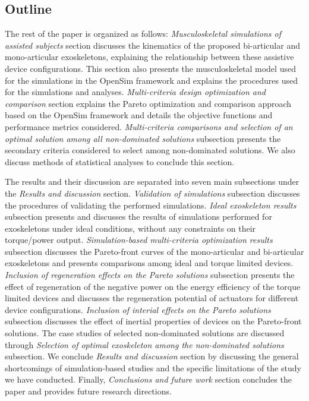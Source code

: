 \documentclass[10pt,letterpaper]{article}
\begin{document}
%


\subsection*{Outline}
The rest of the paper is organized as follows:  \emph{Musculoskeletal simulations of assisted subjects} section discusses the kinematics of the proposed bi-articular and mono-articular exoskeletons, explaining the relationship between these assistive device configurations. This section also presents the musculoskeletal model used for the simulations in the OpenSim framework and explains the procedures used for the simulations and analyses.  \emph{Multi-criteria design optimization and comparison} section explains the Pareto optimization and comparison approach based on the OpenSim framework and details the objective functions and performance metrics considered. \emph{Multi-criteria comparisons and selection of an optimal solution among all non-dominated solutions} subsection presents the  secondary criteria considered to select among non-dominated solutions. We also discuss methods of statistical analyses to conclude this section.

The results and their discussion are separated into seven main subsections under the \emph{Results and discussion} section. \emph{Validation of simulations} subsection discusses the procedures of validating the performed simulations. \emph{Ideal exoskeleton results} subsection presents and discusses the results of simulations performed for exoskeletons under ideal conditions, without any constraints on their torque/power output. \emph{Simulation-based multi-criteria optimization results} subsection discusses the Pareto-front curves of the mono-articular and bi-articular exoskeletons and presents comparisons among ideal and torque limited devices. \emph{Inclusion of regeneration effects on the Pareto solutions} subsection presents the effect of regeneration of the negative power on the energy efficiency of the torque limited devices and discusses the regeneration potential of actuators for different device configurations. \emph{Inclusion of interial effects on the Pareto solutions} subsection discusses the effect of inertial properties of devices on the Pareto-front solutions. The case studies of selected non-dominated solutions are discussed through \emph{Selection of optimal exoskeleton among the non-dominated solutions} subsection. We conclude  \emph{Results and discussion} section by discussing the general shortcomings of simulation-based studies and the specific limitations of the study we have conducted. Finally, \emph{Conclusions and future work} section concludes the paper and provides future research directions.
\end{document}
